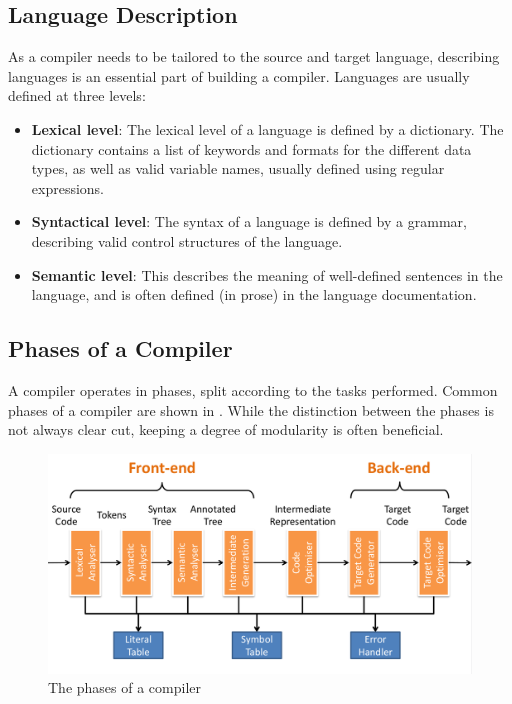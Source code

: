 \documentclass{article}
\begin{document}
\subsection{Language Description}
As a compiler needs to be tailored to the source and target language, describing languages is an essential part of building a compiler.
Languages are usually defined at three levels:
\begin{itemize}
	\item \textbf{Lexical level}:
		The lexical level of a language is defined by a dictionary.
		The dictionary contains a list of keywords and formats for the different data types, as well as valid variable names, usually defined using regular expressions.
	\item \textbf{Syntactical level}:
		The syntax of a language is defined by a grammar, describing valid control structures of the language.
	\item \textbf{Semantic level}:
		This describes the meaning of well-defined sentences in the language, and is often defined (in prose) in the language documentation.
\end{itemize}

\subsection{Phases of a Compiler}
A compiler operates in phases, split according to the tasks performed.
Common phases of a compiler are shown in .
While the distinction between the phases is not always clear cut, keeping a degree of modularity is often beneficial.

\begin{figure}[h]
	\center
	\includegraphics[width=\textwidth]{phases.png}
	\caption{The phases of a compiler}
	\label{fig:phases}
\end{figure}
\end{document}
